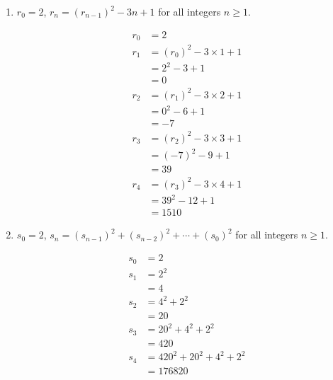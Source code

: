 \documentclass[11pt]{article}
\begin{document}
\begin{enumerate}[label = (\alph*)]
  \item $r_0 = 2$, $r_n = {(r_{n-1})}^2 - 3n + 1$ for all integers $n \geq 1$.

    \begin{align*}
      r_0 &= 2 \\
      r_1 &= {(r_0)}^2 - 3 \times 1 + 1 \\
      &= 2^2 - 3 + 1 \\
      &= 0 \\
      r_2 &= {(r_1)}^2 - 3 \times 2 + 1 \\
      &= 0^2 - 6 + 1 \\
      &= -7 \\
      r_3 &= {(r_2)}^2 - 3 \times 3 + 1 \\
      &= {(-7)}^2 - 9 + 1 \\
      &= 39 \\
      r_4 &= {(r_3)}^2 - 3 \times 4 + 1 \\
      &= 39^2 - 12 + 1 \\
      &= 1510
    \end{align*}

  \item $s_0 = 2$, $s_n = {(s_{n-1})}^2 + {(s_{n-2})}^2 + \cdots + {(s_0)}^2$
  for all integers $n \geq 1$.

    \begin{align*}
      s_0 &= 2 \\
      s_1 &= 2^2 \\
          &= 4 \\
      s_2 &= 4^2 + 2^2 \\
          &= 20 \\
      s_3 &= 20^2 + 4^2 + 2^2 \\
          &= 420 \\
      s_4 &= 420^2 + 20^2 + 4^2 + 2^2 \\
          &= 176820
    \end{align*}
\end{enumerate}
\end{document}
